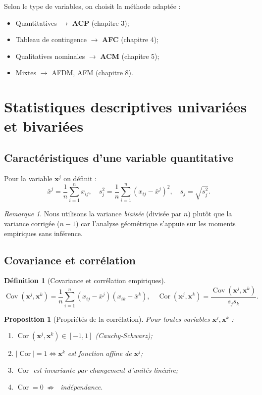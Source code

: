 \documentclass[11pt, a4paper, openany]{book}
\theoremstyle{plain}
\newtheorem{proposition}[theorem]{Proposition}
\theoremstyle{definition}
\newtheorem{definition}[theorem]{Définition}
\theoremstyle{remark}
\newtheorem{remark}[theorem]{Remarque}
\newcommand{\1}{\mathds{1}}
\DeclareMathOperator{\Cov}{Cov}
\DeclareMathOperator{\Cor}{Cor}
\begin{document}
Selon le type de variables, on choisit la méthode adaptée :
\begin{itemize}
  \item Quantitatives $\to$ \textbf{ACP} (chapitre 3);
  \item Tableau de contingence $\to$ \textbf{AFC} (chapitre 4);
  \item Qualitatives nominales $\to$ \textbf{ACM} (chapitre 5);
  \item Mixtes $\to$ AFDM, AFM (chapitre 8).
\end{itemize}

\section{Statistiques descriptives univariées et bivariées}

\subsection{Caractéristiques d'une variable quantitative}
Pour la variable $\mathbf{x}^j$ on définit :
\[
\bar{x}^j = \frac{1}{n}\sum_{i=1}^n x_{ij}, \quad
s_j^2 = \frac{1}{n}\sum_{i=1}^n (x_{ij} - \bar{x}^j)^2, \quad
s_j = \sqrt{s_j^2}.
\]

\begin{remark}
Nous utilisons la variance \textit{biaisée} (divisée par $n$) plutôt que
la variance corrigée ($n-1$) car l'analyse géométrique s'appuie sur les
moments empiriques sans inférence.
\end{remark}

\subsection{Covariance et corrélation}

\begin{definition}[Covariance et corrélation empiriques]
\[
\Cov(\mathbf{x}^j, \mathbf{x}^k) = \frac{1}{n}\sum_{i=1}^n (x_{ij} - \bar{x}^j)(x_{ik} - \bar{x}^k),
\quad
\Cor(\mathbf{x}^j, \mathbf{x}^k) = \frac{\Cov(\mathbf{x}^j, \mathbf{x}^k)}{s_j s_k}.
\]
\end{definition}

\begin{proposition}[Propriétés de la corrélation]
Pour toutes variables $\mathbf{x}^j, \mathbf{x}^k$ :
\begin{enumerate}
  \item $\Cor(\mathbf{x}^j, \mathbf{x}^k) \in [-1, 1]$ (Cauchy-Schwarz);
  \item $|\Cor| = 1 \Leftrightarrow \mathbf{x}^k$ est fonction affine de $\mathbf{x}^j$;
  \item $\Cor$ est invariante par changement d'unités linéaire;
  \item $\Cor = 0 \;\not\Rightarrow\;$ indépendance.
\end{enumerate}
\end{proposition}
\end{document}
